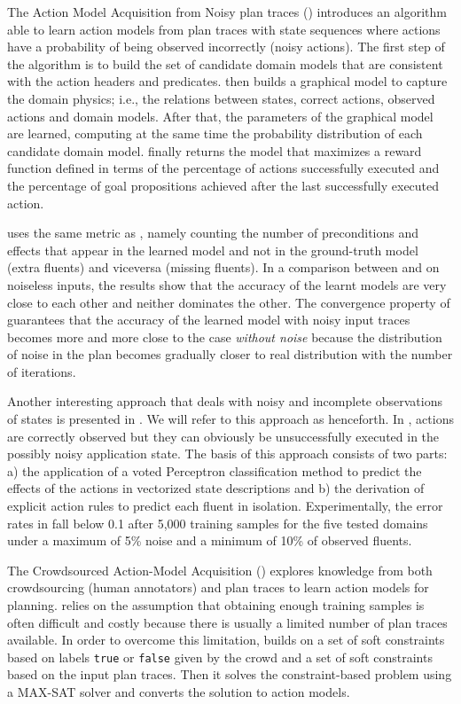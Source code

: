 

The Action Model Acquisition from Noisy plan traces (\textbf{\AMAN}) \cite{zhuo2013action} introduces an algorithm able to learn action models from plan traces with \NO state sequences where actions have a probability of being observed incorrectly (noisy actions). The first step of the \AMAN algorithm is to build the set of candidate domain models that are consistent with the action headers and predicates. \AMAN then builds a graphical model to capture the domain physics; i.e., the relations between states, correct actions, observed actions and domain models. After that, the parameters of the graphical model are learned, computing at the same time the probability distribution of each candidate domain model. \AMAN finally returns the model that maximizes a reward function defined in terms of the percentage of actions successfully executed and the percentage of goal propositions achieved after the last successfully executed action.

\AMAN uses the same metric as \LAMP, namely counting the number of preconditions and effects that appear in the learned model and not in the ground-truth model (extra fluents) and viceversa (missing fluents). In a comparison between \AMAN and \ARMS on noiseless inputs, the results show that the accuracy of the learnt models are very close to each other and neither dominates the other. The convergence property of \AMAN guarantees that the accuracy of the learned model with noisy input traces becomes more and more close to the case  \emph{without noise} because the distribution of noise in the plan becomes gradually closer to real distribution with the number of iterations.


Another interesting approach that deals with noisy and incomplete observations of states is presented in \cite{MouraoZPS12}. We will refer to this approach as \textbf{\NOISTA} henceforth. In \NOISTA, actions are correctly observed but they can obviously be unsuccessfully executed in the possibly noisy application state. The basis of this approach consists of two parts: a) the application of a voted Perceptron classification method to predict the effects of the actions in vectorized state descriptions and b) the derivation of explicit \strips \texttt{} action rules to predict each fluent in isolation. Experimentally, the error rates in \NOISTA fall below 0.1 after 5,000 training samples for the five tested domains under a maximum of 5\% noise and a minimum of 10\% of observed fluents.

The Crowdsourced Action-Model Acquisition (\textbf{\CAMA}) \cite{Zhuo15} explores knowledge from both crowdsourcing (human annotators) and plan traces to learn action models for planning. \CAMA relies on the assumption that obtaining enough training samples is often difficult and costly because there is usually a limited number of plan traces available. In order to overcome this limitation, \CAMA builds on a set of soft constraints based on labels \texttt{true} or \texttt{false} given by the crowd and a set of soft constraints based on the input plan traces. Then it solves the constraint-based problem using a MAX-SAT solver and converts the solution to action models.

